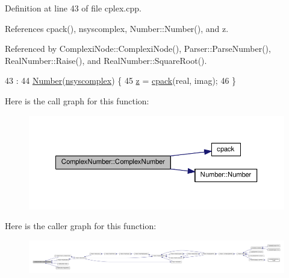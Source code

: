 Definition at line 43 of file cplex.\+cpp.



References cpack(), nsyscomplex, Number\+::\+Number(), and z.



Referenced by Complexi\+Node\+::\+Complexi\+Node(), Parser\+::\+Parse\+Number(), Real\+Number\+::\+Raise(), and Real\+Number\+::\+Square\+Root().


\begin{DoxyCode}
43                                                      :
44     \hyperlink{structNumber_afd3c2f9b4b288e339f741a6e4ae54593}{Number}(\hyperlink{numb_8h_a1475a201d2346881ce88dfbacf628c7da3b38c947375a3db3a4bc184a11c8ee42}{nsyscomplex}) \{
45     \hyperlink{structComplexNumber_a5f72da71f4ce0d88076a391369239042}{z} = \hyperlink{complex_8h_a980e6e049f7902b05fc9eb5614b07a5c}{cpack}(real, imag);
46 \}
\end{DoxyCode}


Here is the call graph for this function\+:\nopagebreak
\begin{figure}[H]
\begin{center}
\leavevmode
\includegraphics[width=350pt]{structComplexNumber_af0a78be5e675c845b8dc2bf8e5e8f32b_cgraph}
\end{center}
\end{figure}




Here is the caller graph for this function\+:\nopagebreak
\begin{figure}[H]
\begin{center}
\leavevmode
\includegraphics[width=350pt]{structComplexNumber_af0a78be5e675c845b8dc2bf8e5e8f32b_icgraph}
\end{center}
\end{figure}


